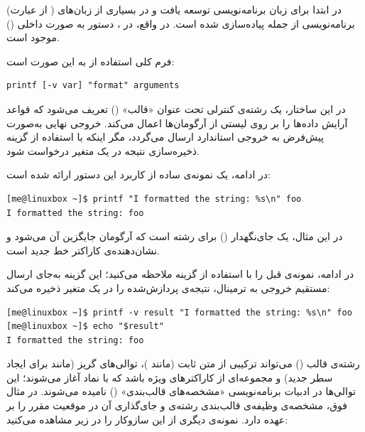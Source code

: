  (از عبارت ) در ابتدا برای زبان برنامه‌نویسی  توسعه یافت و در بسیاری از زبان‌های برنامه‌نویسی از جمله  پیاده‌سازی شده است. در واقع، در ، دستور  به صورت داخلی () موجود است.

فرم کلی استفاده از  به این صورت است:

\begin{latin}
\begin{lstlisting}
printf [-v var] "format" arguments
\end{lstlisting}
\end{latin}

در این ساختار، یک رشته‌ی کنترلی تحت عنوان «قالب» () تعریف می‌شود که قواعد آرایش داده‌ها را بر روی لیستی از آرگومان‌ها اعمال می‌کند. خروجی نهایی به‌صورت پیش‌فرض به خروجی استاندارد ارسال می‌گردد، مگر اینکه با استفاده از گزینه  ذخیره‌سازی نتیجه در یک متغیر درخواست شود.

در ادامه، یک نمونه‌ی ساده از کاربرد این دستور ارائه شده است:

\begin{latin}
\begin{lstlisting}
[me@linuxbox ~]$ printf "I formatted the string: %s\n" foo
I formatted the string: foo
\end{lstlisting}
\end{latin}

در این مثال،  یک جای‌نگهدار () برای رشته است که آرگومان  جایگزین آن می‌شود و  نشان‌دهنده‌ی کاراکتر خط جدید است.

در ادامه، نمونه‌ی قبل را با استفاده از گزینه  ملاحظه می‌کنید؛ این گزینه به‌جای ارسال مستقیم خروجی به ترمینال، نتیجه‌ی پردازش‌شده را در یک متغیر ذخیره می‌کند:

\begin{latin}
\begin{lstlisting}
[me@linuxbox ~]$ printf -v result "I formatted the string: %s\n" foo
[me@linuxbox ~]$ echo "$result"
I formatted the string: foo
\end{lstlisting}
\end{latin}

رشته‌ی قالب () می‌تواند ترکیبی از متن ثابت (مانند )، توالی‌های گریز (مانند  برای ایجاد سطر جدید) و مجموعه‌ای از کاراکترهای ویژه باشد که با نماد \cmd{\%} آغاز می‌شوند؛ این توالی‌ها در ادبیات برنامه‌نویسی «مشخصه‌های قالب‌بندی» () نامیده می‌شوند. در مثال فوق، مشخصه‌ی  وظیفه‌ی قالب‌بندی رشته‌ی  و جای‌گذاری آن در موقعیت مقرر را بر عهده دارد. نمونه‌ی دیگری از این سازوکار را در زیر مشاهده می‌کنید:

